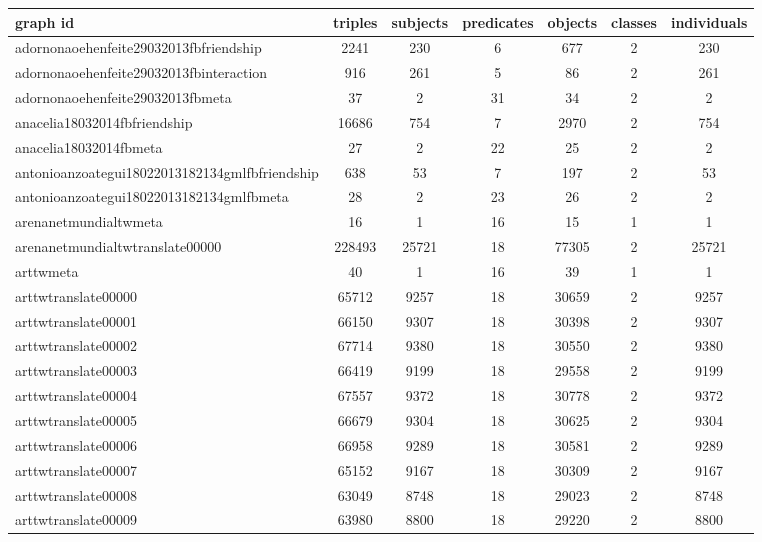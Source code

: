 \begin{table*}[h!]
\begin{center}
\begin{tabular}{| l | c | c | c | c | c | c |}\hline
graph id & triples & subjects & predicates & objects & classes & individuals \\\hline
adornonaoehenfeite29032013fbfriendship & 2241  & 230  & 6  & 677  & 2  & 230 \\\hline
adornonaoehenfeite29032013fbinteraction & 916  & 261  & 5  & 86  & 2  & 261 \\\hline
adornonaoehenfeite29032013fbmeta & 37  & 2  & 31  & 34  & 2  & 2 \\\hline
anacelia18032014fbfriendship & 16686  & 754  & 7  & 2970  & 2  & 754 \\\hline
anacelia18032014fbmeta & 27  & 2  & 22  & 25  & 2  & 2 \\\hline
antonioanzoategui18022013182134gmlfbfriendship & 638  & 53  & 7  & 197  & 2  & 53 \\\hline
antonioanzoategui18022013182134gmlfbmeta & 28  & 2  & 23  & 26  & 2  & 2 \\\hline
arenanetmundialtwmeta & 16  & 1  & 16  & 15  & 1  & 1 \\\hline
arenanetmundialtwtranslate00000 & 228493  & 25721  & 18  & 77305  & 2  & 25721 \\\hline
arttwmeta & 40  & 1  & 16  & 39  & 1  & 1 \\\hline
arttwtranslate00000 & 65712  & 9257  & 18  & 30659  & 2  & 9257 \\\hline
arttwtranslate00001 & 66150  & 9307  & 18  & 30398  & 2  & 9307 \\\hline
arttwtranslate00002 & 67714  & 9380  & 18  & 30550  & 2  & 9380 \\\hline
arttwtranslate00003 & 66419  & 9199  & 18  & 29558  & 2  & 9199 \\\hline
arttwtranslate00004 & 67557  & 9372  & 18  & 30778  & 2  & 9372 \\\hline
arttwtranslate00005 & 66679  & 9304  & 18  & 30625  & 2  & 9304 \\\hline
arttwtranslate00006 & 66958  & 9289  & 18  & 30581  & 2  & 9289 \\\hline
arttwtranslate00007 & 65152  & 9167  & 18  & 30309  & 2  & 9167 \\\hline
arttwtranslate00008 & 63049  & 8748  & 18  & 29023  & 2  & 8748 \\\hline
arttwtranslate00009 & 63980  & 8800  & 18  & 29220  & 2  & 8800 \\\hline

\end{tabular}
\end{center}
\end{table*}
